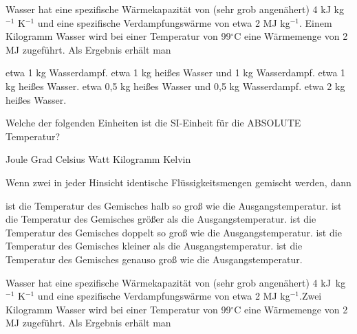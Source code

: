 \documentclass[11pt]{exam}
\begin{document}
\setlength{\voffset}{-0.5in}
\setlength{\headsep}{5pt}

\hspace{2mm}
 \hspace{5mm}
\vspace{4mm}

\begin{questions}

\question Wasser hat eine spezifische Wärmekapazität von (sehr grob angenähert) 4 kJ kg\(^{-1}\) K\(^{-1}\) und eine spezifische Verdampfungswärme von etwa 2 MJ kg\(^{-1}\). Einem Kilogramm Wasser wird bei einer Temperatur von 99\(^\circ\)C eine Wärmemenge von 2 MJ zugeführt. Als Ergebnis erhält man

\begin{choices}
	\choice etwa 1 kg Wasserdampf.
	\choice etwa 1 kg heißes Wasser und 1 kg Wasserdampf.
	\choice etwa 1 kg heißes Wasser.
	\choice etwa 0,5 kg heißes Wasser und 0,5 kg Wasserdampf.
	\choice etwa 2 kg heißes Wasser.
\end{choices}

\vspace{3mm}\question Welche der folgenden Einheiten ist die SI-Einheit für die ABSOLUTE Temperatur?

\begin{choices}
	\choice Joule
	\choice Grad Celsius
	\choice Watt
	\choice Kilogramm
	\choice Kelvin
\end{choices}

\vspace{3mm}\question Wenn zwei in jeder Hinsicht identische Flüssigkeitsmengen gemischt werden, dann

\begin{choices}
	\choice ist die Temperatur des Gemisches halb so groß wie die Ausgangstemperatur.
	\choice ist die Temperatur des Gemisches größer als die Ausgangstemperatur.
	\choice ist die Temperatur des Gemisches doppelt so groß wie die Ausgangstemperatur.
	\choice ist die Temperatur des Gemisches kleiner als die Ausgangstemperatur.
	\choice ist die Temperatur des Gemisches genauso groß wie die Ausgangstemperatur.
\end{choices}

\vspace{3mm}\question Wasser hat eine spezifische Wärmekapazität von (sehr grob angenähert) 4 kJ kg\(^{-1}\) K\(^{-1}\) und eine spezifische Verdampfungswärme von etwa 2 MJ kg\(^{-1}\).Zwei Kilogramm Wasser wird bei einer Temperatur von 99\(^\circ\)C eine Wärmemenge von 2 MJ zugeführt. Als Ergebnis erhält man


\end{questions}
\end{document}
